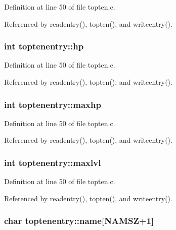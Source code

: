 Definition at line 50 of file topten.\+c.



Referenced by readentry(), topten(), and writeentry().

\hypertarget{structtoptenentry_a6190d60218b470dbdbe6952f0f8f3748}{
\subsubsection[{hp}]{\setlength{\rightskip}{0pt plus 5cm}int toptenentry\+::hp}}\label{structtoptenentry_a6190d60218b470dbdbe6952f0f8f3748}


Definition at line 50 of file topten.\+c.



Referenced by readentry(), topten(), and writeentry().

\hypertarget{structtoptenentry_af73023379d229a55babd99cbe7c10c2a}{
\subsubsection[{maxhp}]{\setlength{\rightskip}{0pt plus 5cm}int toptenentry\+::maxhp}}\label{structtoptenentry_af73023379d229a55babd99cbe7c10c2a}


Definition at line 50 of file topten.\+c.



Referenced by readentry(), topten(), and writeentry().

\hypertarget{structtoptenentry_a7584f5f58a62ce331c87c6751581e8b0}{
\subsubsection[{maxlvl}]{\setlength{\rightskip}{0pt plus 5cm}int toptenentry\+::maxlvl}}\label{structtoptenentry_a7584f5f58a62ce331c87c6751581e8b0}


Definition at line 50 of file topten.\+c.



Referenced by readentry(), topten(), and writeentry().

\hypertarget{structtoptenentry_ae979ed735fbaba2080cd14248c9f8641}{
\subsubsection[{name}]{\setlength{\rightskip}{0pt plus 5cm}char toptenentry\+::name\mbox{[}{\bf N\+A\+M\+S\+Z}+1\mbox{]}}}\label{structtoptenentry_ae979ed735fbaba2080cd14248c9f8641}


